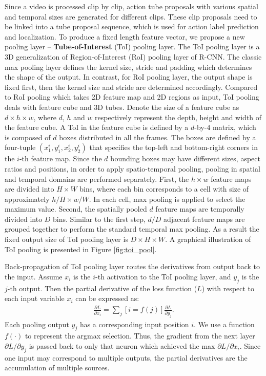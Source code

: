 \documentclass[10pt,twocolumn,letterpaper]{article}
\begin{document}
Since a video is processed clip by clip, action tube proposals with various spatial and temporal sizes are generated for different clips. These clip proposals need to be linked into a  tube proposal sequence, which  is used for action label prediction and localization. To produce a fixed length feature vector, we propose a new pooling layer -- {\bf Tube-of-Interest} (ToI) pooling layer. The ToI pooling layer is a 3D generalization of Region-of-Interest (RoI) pooling layer of R-CNN. The classic max pooling layer defines the kernel size, stride and padding which determines the shape of the output. In contrast, for RoI pooling layer, the output shape is fixed first, then the kernel size and stride are determined accordingly. Compared to RoI pooling which takes 2D feature map and 2D regions as input, ToI pooling deals with feature cube and  3D tubes. Denote the size of a feature cube as $d\times h\times w$, where $d$, $h$ and $w$ respectively represent the depth, height and width of the feature cube. A ToI in the feature cube is defined by a $d$-by-$4$ matrix, which is composed of $d$ boxes distributed in all the frames. The boxes are defined by a four-tuple $(x_{1}^{i}, y_{1}^{i}, x_{2}^{i}, y_{2}^{i})$ that specifies the top-left and bottom-right corners in the $i$-th feature map. Since the $d$ bounding boxes may have different sizes, aspect ratios and positions, in order to apply spatio-temporal pooling, pooling in spatial and  temporal domains are performed separately. First, the $h\times w$ feature maps are divided  into $H\times W$ bins, where each bin corresponds to a cell with size of approximately $h/H\times w/W$. In each cell, max pooling is applied to select the maximum value. Second, the spatially pooled $d$ feature maps are temporally divided into $D$ bins. Similar to the first step, $d/D$ adjacent feature maps are grouped together to perform the standard temporal max pooling.  As a result the fixed output size of ToI pooling layer is $D \times H \times W$. A graphical illustration of ToI pooling is presented in Figure \ref{fig:toi_pool}.

Back-propagation of ToI pooling layer routes the derivatives from output back to the input. Assume $x_{i}$ is the $i$-th activation to the ToI pooling layer, and $y_{j}$ is the $j$-th output. Then the partial derivative of the loss function ($L$) with respect to each input variable $x_i$ can be expressed as:
\begin{align}
\frac{\partial L}{\partial x_{i}} = \sum_{j}[i = f(j)]\frac{\partial L}{\partial y_{j}}.
\end{align}
Each pooling output $y_j$ has a corresponding input position $i$. We use a function $f(\cdot)$ to represent the argmax selection. Thus, the gradient from the next layer $\partial L / \partial y_{j}$ is passed back to only that neuron which achieved the max $\partial L / \partial x_{i}$. Since one input may correspond to multiple outputs, the partial derivatives are the accumulation of multiple sources.
\end{document}
